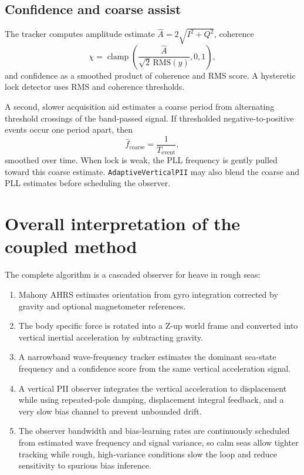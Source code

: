 \documentclass[conference]{IEEEtran}
\DeclareMathOperator{\clamp}{clamp}
\begin{document}
\subsection{Confidence and coarse assist}
The tracker computes amplitude estimate $\hat{A}=2\sqrt{I^2+Q^2}$, coherence
\begin{equation}
\chi = \clamp\!\left(\frac{\hat{A}}{\sqrt{2}\,\mathrm{RMS}(y)},0,1\right),
\end{equation}
and confidence as a smoothed product of coherence and RMS score. A hysteretic lock detector uses RMS and coherence thresholds.

A second, slower acquisition aid estimates a coarse period from alternating threshold crossings of the band-passed signal. If thresholded negative-to-positive events occur one period apart, then
\begin{equation}
\hat{f}_{\mathrm{coarse}} = \frac{1}{T_{\mathrm{event}}},
\end{equation}
smoothed over time. When lock is weak, the PLL frequency is gently pulled toward this coarse estimate. \texttt{AdaptiveVerticalPII} may also blend the coarse and PLL estimates before scheduling the observer.

\section{Overall interpretation of the coupled method}
The complete algorithm is a cascaded observer for heave in rough seas:
\begin{enumerate}[leftmargin=*]
\item Mahony AHRS estimates orientation from gyro integration corrected by gravity and optional magnetometer references.
\item The body specific force is rotated into a Z-up world frame and converted into vertical inertial acceleration by subtracting gravity.
\item A narrowband wave-frequency tracker estimates the dominant sea-state frequency and a confidence score from the same vertical acceleration signal.
\item A vertical PII observer integrates the vertical acceleration to displacement while using repeated-pole damping, displacement integral feedback, and a very slow bias channel to prevent unbounded drift.
\item The observer bandwidth and bias-learning rates are continuously scheduled from estimated wave frequency and signal variance, so calm seas allow tighter tracking while rough, high-variance conditions slow the loop and reduce sensitivity to spurious bias inference.
\end{enumerate}
\end{document}
